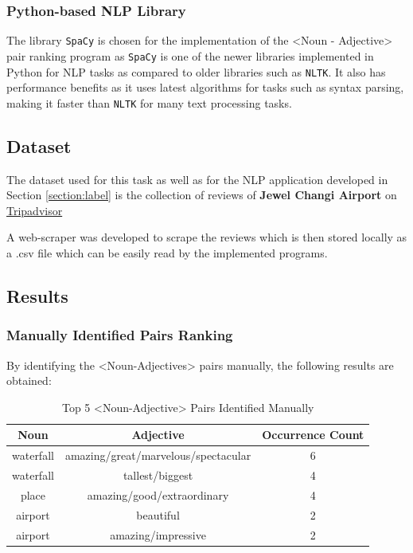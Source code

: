 \documentclass[sigconf,nonacm=true]{acmart}
\begin{document}
\subsubsection{Python-based NLP Library}
The library \verb|SpaCy| is chosen for the implementation of the <Noun - Adjective> pair ranking program as \verb|SpaCy| is one of the newer libraries implemented in Python for NLP tasks as compared to older libraries such as \verb|NLTK|. It also has performance benefits as it uses latest algorithms for tasks such as syntax parsing, making it faster than \verb|NLTK| for many text processing tasks.

\subsection{Dataset}
\label{subsection:dataset}
The dataset used for this task as well as for the NLP application developed in Section \ref{section:label} is the collection of reviews of \textbf{Jewel Changi Airport} on \href{https://www.tripadvisor.com.sg/Attraction_Review-g294265-d17237163-Reviews-Jewel_Changi_Airport-Singapore.html}{Tripadvisor}

A web-scraper was developed to scrape the reviews which is then stored locally as a .csv file which can be easily read by the implemented programs.

\subsection{Results}
\subsubsection{Manually Identified Pairs Ranking}
By identifying the <Noun-Adjectives> pairs manually, the following results are obtained:
\begin{table}[H]
	\label{tab:manualpairs}
	\begin{adjustbox}{width=\columnwidth}
	\begin{tabular}{ccc}
		\toprule
		Noun&Adjective&Occurrence Count\\
		\midrule
		waterfall & amazing/great/marvelous/spectacular & 6 \\
		waterfall & tallest/biggest & 4 \\
		place & amazing/good/extraordinary & 4 \\
		airport & beautiful & 2 \\
		airport & amazing/impressive & 2 \\
		\bottomrule
	\end{tabular}
	\end{adjustbox}
	\caption{Top 5 <Noun-Adjective> Pairs Identified Manually}
\end{table}
\end{document}
